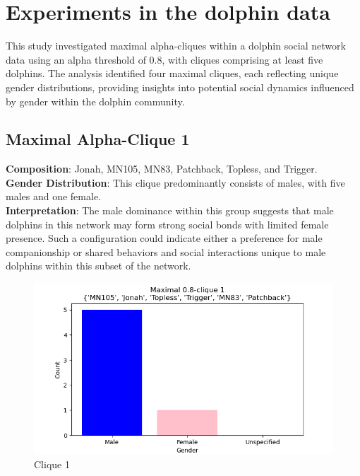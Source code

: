 \section{Experiments in the dolphin data}
This study investigated maximal alpha-cliques within a dolphin social network data using an alpha threshold of 0.8, with cliques comprising at least five dolphins. The analysis identified four maximal cliques, each reflecting unique gender distributions, providing insights into potential social dynamics influenced by gender within the dolphin community.

\subsection{Maximal Alpha-Clique 1}
\textbf{Composition}: Jonah, MN105, MN83, Patchback, Topless, and Trigger. \\
\textbf{Gender Distribution}: This clique predominantly consists of males, with five males and one female. \\
\textbf{Interpretation}: The male dominance within this group suggests that male dolphins in this network may form strong social bonds with limited female presence. Such a configuration could indicate either a preference for male companionship or shared behaviors and social interactions unique to male dolphins within this subset of the network.
\begin{figure}[H]
    \centering
    \includegraphics[width=1.0\textwidth]{imgs/clique_1.png}
    \caption{Clique 1}
    \label{fig:clique_1}
\end{figure}

